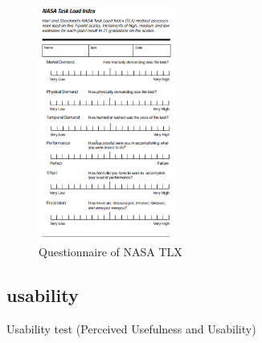 \begin{figure}[ht!]
	\centering
    \includegraphics[width=0.4\textwidth]{5-Experiments/NASATLX}
	\caption{Questionnaire of NASA TLX}
    \label{fig:nasa_tlx}
\end{figure}

\subsection{usability}

Usability test (Perceived Usefulness and Usability)




